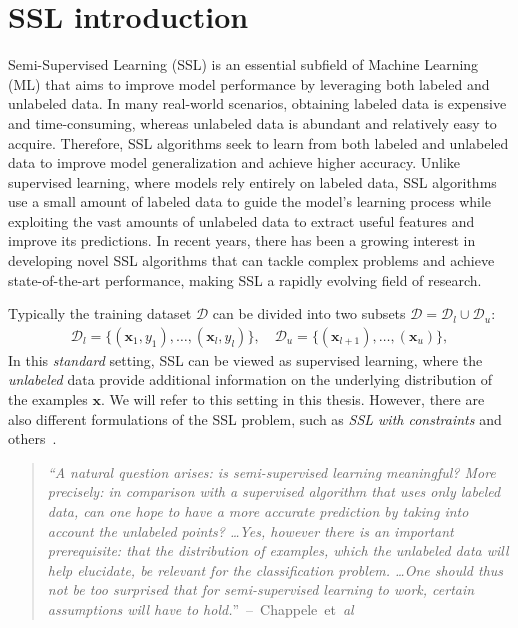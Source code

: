 \section{SSL introduction}
\label{sec:ssl-introduction}
Semi-Supervised Learning (SSL) is an essential subfield of Machine Learning (ML) that aims to improve model performance by leveraging 
both labeled and unlabeled data. In many real-world scenarios, obtaining labeled data is expensive and time-consuming, whereas 
unlabeled data is abundant and relatively easy to acquire. Therefore, SSL algorithms seek to learn from both labeled and unlabeled 
data to improve model generalization and achieve higher accuracy. Unlike supervised learning, where models rely entirely on labeled 
data, SSL algorithms use a small amount of labeled data to guide the model's learning process while exploiting the vast amounts of 
unlabeled data to extract useful features and improve its predictions. In recent years, there has been a growing interest in developing
novel SSL algorithms that can tackle complex problems and achieve state-of-the-art performance, making SSL a rapidly evolving field of 
research. 

Typically the training dataset $\mathcal{D}$ can be divided into two subsets $\mathcal{D} = \mathcal{D}_l \cup \mathcal{D}_u$:
\begin{align*}
    \mathcal{D}_l = \{(\mathbf{x}_1,y_1),\dots, (\mathbf{x}_l,y_l)\},\quad \mathcal{D}_u = \{(\mathbf{x}_{l+1}),\dots,(\mathbf{x}_{u})\},
\end{align*}
In this \textit{standard} setting, SSL can be viewed as supervised learning, where 
the \textit{unlabeled} data provide additional information on the underlying distribution of the examples $\mathbf{x}$.
We will refer to this setting in this thesis. However, there are also different formulations of the SSL problem, such as \textit{SSL with constraints}
and others~\cite[p. 1]{ssl-book-2006}.

\begin{quote}
    \textit{
    ``A natural question arises: is semi-supervised learning meaningful? More precisely:
    in comparison with a supervised algorithm that uses only labeled data, can one
    hope to have a more accurate prediction by taking into account the unlabeled
    points? \dots Yes, however there is an important prerequisite: that the
    distribution of examples, which the unlabeled data will help elucidate, be relevant
    for the classification problem.
    \dots One should thus not be too surprised that for semi-supervised learning to work,
    certain assumptions will have to hold.}''~--~Chappele~et~\textit{al}~\cite[p. 4]{ssl-book-2006}
\end{quote}

